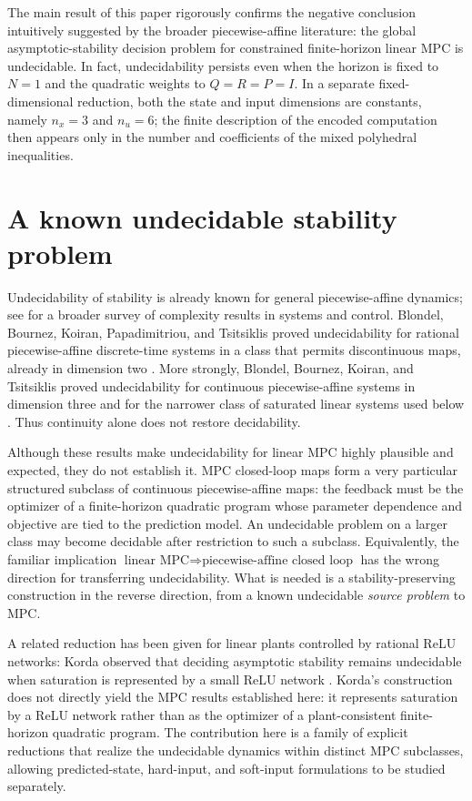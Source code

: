 \documentclass{IEEEtran}
\theoremstyle{remark}
\begin{document}
The main result of this paper rigorously confirms the negative conclusion intuitively suggested by the broader piecewise-affine literature: the global asymptotic-stability decision problem for constrained finite-horizon linear MPC is undecidable.  In fact, undecidability persists even when the horizon is fixed to $N=1$ and the quadratic weights to $Q=R=P=I$.  In a separate fixed-dimensional reduction, both the state and input dimensions are constants, namely $n_x=3$ and $n_u=6$; the finite description of the encoded computation then appears only in the number and coefficients of the mixed polyhedral inequalities.

\section{A known undecidable stability problem}

Undecidability of stability is already known for general piecewise-affine dynamics; see \cite{BlondelTsitsiklis2000} for a broader survey of complexity results in systems and control.  Blondel, Bournez, Koiran, Papadimitriou, and Tsitsiklis proved undecidability for rational piecewise-affine discrete-time systems in a class that permits discontinuous maps, already in dimension two \cite{BlondelEtAlPWA2001}.  More strongly, Blondel, Bournez, Koiran, and Tsitsiklis proved undecidability for continuous piecewise-affine systems in dimension three and for the narrower class of saturated linear systems used below \cite{BlondelEtAl2001}.  Thus continuity alone does not restore decidability.

Although these results make undecidability for linear MPC highly plausible and expected, they do not establish it.  MPC closed-loop maps form a very particular structured subclass of continuous piecewise-affine maps: the feedback must be the optimizer of a finite-horizon quadratic program whose parameter dependence and objective are tied to the prediction model.  An undecidable problem on a larger class may become decidable after restriction to such a subclass.  Equivalently, the familiar implication $\text{linear MPC}\Longrightarrow\text{piecewise-affine closed loop}$ has the wrong direction for transferring undecidability.  What is needed is a stability-preserving construction in the reverse direction, from a known undecidable \emph{source problem} to MPC.

A related reduction has been given for linear plants controlled by rational ReLU networks: Korda observed that deciding asymptotic stability remains undecidable when saturation is represented by a small ReLU network \cite{Korda2022}.  Korda's construction does not directly yield the MPC results established here: it represents saturation by a ReLU network rather than as the optimizer of a plant-consistent finite-horizon quadratic program.  The contribution here is a family of explicit reductions that realize the undecidable dynamics within distinct MPC subclasses, allowing predicted-state, hard-input, and soft-input formulations to be studied separately.
\end{document}
